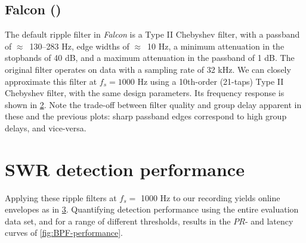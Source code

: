 \begin{figure}
\label{fig:dutta}
\end{figure}


\subsection{Falcon ()}

The default ripple filter in \emph{Falcon} is a Type II Chebyshev filter, with a passband of $\approx$~130--283 Hz, edge widths of $\approx$~10 Hz, a minimum attenuation in the stopbands of 40 dB, and a maximum attenuation in the passband of 1 dB. The original filter operates on data with a sampling rate of 32 kHz. We can closely approximate this filter at $f_s = 1000$ Hz using a 10th-order (21-taps) Type II Chebyshev filter, with the same design parameters. Its frequency response is shown in \cref{fig:falcon}. Note the trade-off between filter quality and group delay apparent in these and the previous plots: sharp passband edges correspond to high group delays, and vice-versa.

\begin{figure}
\label{fig:falcon}
\end{figure}



\section{SWR detection performance}

Applying these ripple filters at $f_s = $ 1000 Hz to our recording yields online envelopes as in \cref{fig:BPF-outputs}. Quantifying detection performance using the entire evaluation data set, and for a range of different thresholds, results in the $PR$- and latency curves of \cref{fig:BPF-performance}.

\begin{figure}
\label{fig:BPF-outputs}
\end{figure}

